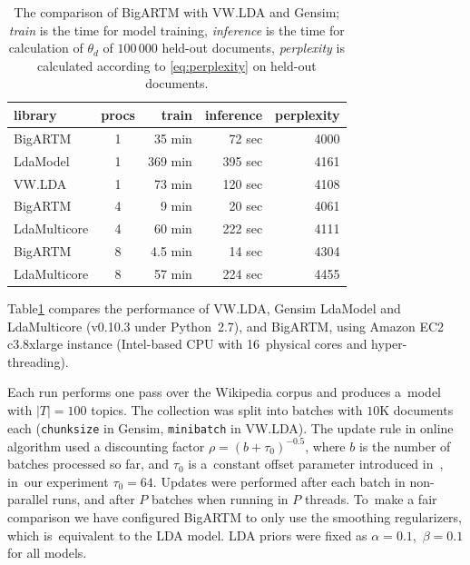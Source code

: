 \documentclass{sig-alternate-2013}
\begin{document}
\begin{table}[t]
	\caption{
        The comparison of BigARTM with VW.LDA and Gensim;
        \emph{train} is the time for model training,
        \emph{inference} is the time for calculation of $\theta_d$ of $100\,000$ held-out documents,
        \emph{perplexity} is calculated according to \eqref{eq:perplexity} on held-out documents.
    }
	\label{tab:libraries_comparison}
    \centering\tabcolsep=4.3pt
	\begin{tabular}[t]{l|c|rrr}
	\hline
	library & procs & train & inference & perplexity \\
	\hline
	BigARTM & 1 & 35 min & 72 sec & 4000 \\
	LdaModel & 1 & 369 min & 395 sec & 4161  \\
	VW.LDA & 1 & 73 min & 120 sec & 4108 \\
	\hline
	BigARTM & 4 & 9 min & 20 sec & 4061  \\
	LdaMulticore & 4 & 60 min & 222 sec & 4111  \\	
	\hline
	BigARTM & 8 & 4.5 min & 14 sec & 4304  \\
	LdaMulticore & 8 & 57 min & 224 sec & 4455 \\
	\hline
	\end{tabular}
\end{table}
%

Table\;\ref{tab:libraries_comparison} compares the performance of
VW.LDA, Gensim LdaModel and LdaMulticore (\mbox{v0.10.3} under Python~\mbox{2.7}), and BigARTM,
using Amazon EC2 c3.8xlarge instance (Intel-based CPU with 16~physical cores and hyper-threading).

Each run performs one pass over the Wikipedia corpus and produces a~model with $|T|=100$ topics.
The collection was split into batches with $10$K documents each
(\texttt{chunksize} in Gensim, \texttt{minibatch} in VW.LDA).
The update rule in online algorithm used a discounting factor
${\rho = (b + \tau_0)^{-0.5}}$,
where $b$ is the number of batches processed so far,
and $\tau_0$ is a~constant offset parameter introduced in~\cite{hoffman10online},
in~our experiment ${\tau_0 = 64}$.
\mbox{Updates} were performed after each batch in non-parallel runs, and after $P$ batches when running in $P$ threads.
To~make a fair comparison we have configured BigARTM to only use the smoothing regularizers,
which is~equivalent to the LDA model.
LDA priors were fixed as ${\alpha = 0.1}$,\, ${\beta = 0.1}$ for all models.
\end{document}
